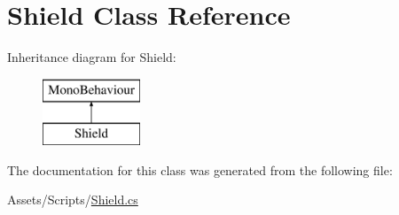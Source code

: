 \hypertarget{class_shield}{}\section{Shield Class Reference}
\label{class_shield}
Inheritance diagram for Shield\+:\begin{figure}[H]
\begin{center}
\leavevmode
\includegraphics[height=2.000000cm]{class_shield}
\end{center}
\end{figure}


The documentation for this class was generated from the following file\+:\begin{DoxyCompactItemize}
\item 
Assets/\+Scripts/\mbox{\hyperlink{_shield_8cs}{Shield.\+cs}}\end{DoxyCompactItemize}
